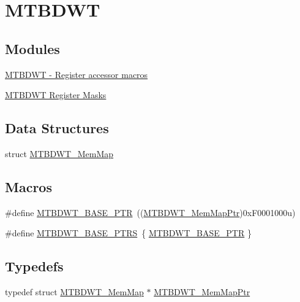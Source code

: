 \hypertarget{group___m_t_b_d_w_t___peripheral}{}\section{M\+T\+B\+D\+W\+T}
\label{group___m_t_b_d_w_t___peripheral}
\subsection*{Modules}
\begin{DoxyCompactItemize}
\item 
\hyperlink{group___m_t_b_d_w_t___register___accessor___macros}{M\+T\+B\+D\+W\+T -\/ Register accessor macros}
\item 
\hyperlink{group___m_t_b_d_w_t___register___masks}{M\+T\+B\+D\+W\+T Register Masks}
\end{DoxyCompactItemize}
\subsection*{Data Structures}
\begin{DoxyCompactItemize}
\item 
struct \hyperlink{struct_m_t_b_d_w_t___mem_map}{M\+T\+B\+D\+W\+T\+\_\+\+Mem\+Map}
\end{DoxyCompactItemize}
\subsection*{Macros}
\begin{DoxyCompactItemize}
\item 
\#define \hyperlink{group___m_t_b_d_w_t___peripheral_ga97d048bfb5a11293a38c444b8347ff42}{M\+T\+B\+D\+W\+T\+\_\+\+B\+A\+S\+E\+\_\+\+P\+T\+R}~((\hyperlink{group___m_t_b_d_w_t___peripheral_ga8dd9bf791ed255926ccd995a6236caaf}{M\+T\+B\+D\+W\+T\+\_\+\+Mem\+Map\+Ptr})0x\+F0001000u)
\item 
\#define \hyperlink{group___m_t_b_d_w_t___peripheral_ga0cbd89263cdbe0c07c59ed21112ea9ad}{M\+T\+B\+D\+W\+T\+\_\+\+B\+A\+S\+E\+\_\+\+P\+T\+R\+S}~\{ \hyperlink{group___m_t_b_d_w_t___peripheral_ga97d048bfb5a11293a38c444b8347ff42}{M\+T\+B\+D\+W\+T\+\_\+\+B\+A\+S\+E\+\_\+\+P\+T\+R} \}
\end{DoxyCompactItemize}
\subsection*{Typedefs}
\begin{DoxyCompactItemize}
\item 
typedef struct \hyperlink{struct_m_t_b_d_w_t___mem_map}{M\+T\+B\+D\+W\+T\+\_\+\+Mem\+Map} $\ast$ \hyperlink{group___m_t_b_d_w_t___peripheral_ga8dd9bf791ed255926ccd995a6236caaf}{M\+T\+B\+D\+W\+T\+\_\+\+Mem\+Map\+Ptr}
\end{DoxyCompactItemize}


